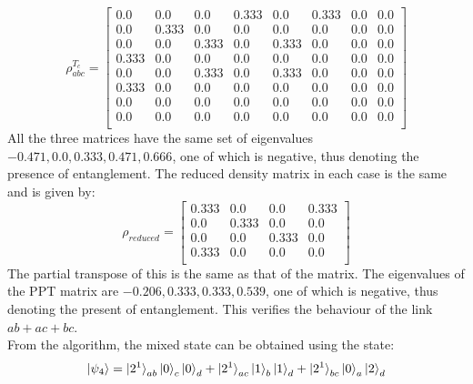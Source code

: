 \documentclass{scrartcl}
\begin{document}
            \begin{equation}
                \rho^{T_c}_{abc}=
                \left[
                \begin{array}{cccccccc}
                0.0 & 0.0 & 0.0 & 0.333 & 0.0 & 0.333 & 0.0 & 0.0 \\
                0.0 & 0.333 & 0.0 & 0.0 & 0.0 & 0.0 & 0.0 & 0.0 \\
                0.0 & 0.0 & 0.333 & 0.0 & 0.333 & 0.0 & 0.0 & 0.0 \\
                0.333 & 0.0 & 0.0 & 0.0 & 0.0 & 0.0 & 0.0 & 0.0 \\
                0.0 & 0.0 & 0.333 & 0.0 & 0.333 & 0.0 & 0.0 & 0.0 \\
                0.333 & 0.0 & 0.0 & 0.0 & 0.0 & 0.0 & 0.0 & 0.0 \\
                0.0 & 0.0 & 0.0 & 0.0 & 0.0 & 0.0 & 0.0 & 0.0 \\
                0.0 & 0.0 & 0.0 & 0.0 & 0.0 & 0.0 & 0.0 & 0.0 \\
                \end{array}
                \right]
                \end{equation}
               All the three matrices have the same set of eigenvalues $-0.471, 0.0, 0.333, 0.471, 0.666$, one of which is negative, thus denoting the presence of entanglement. The reduced density matrix in each case is the same and is given by:
               \begin{equation}
                \rho_{reduced} =
                \left[
                \begin{array}{cccc}
                0.333 & 0.0 & 0.0 & 0.333 \\
                0.0 & 0.333 & 0.0 & 0.0 \\
                0.0 & 0.0 & 0.333 & 0.0 \\
                0.333 & 0.0 & 0.0 & 0.0 \\
                \end{array}
                \right]
                \end{equation}
                The partial transpose of this is the same as that of the matrix. The eigenvalues of the PPT matrix are $-0.206, 0.333, 0.333, 0.539$, one of which is negative, thus denoting the present of entanglement. This verifies the behaviour of the link $ab+ac+bc$. \\[0.3cm]
From the algorithm, the mixed state can be obtained using the state:
$$\ket{\psi_4} = \ket{2^1}_{ab}\ket{0}_c\ket{0}_d+\ket{2^1}_{ac}\ket{1}_b\ket{1}_d+\ket{2^1}_{bc}\ket{0}_a\ket{2}_d$$
\end{document}
